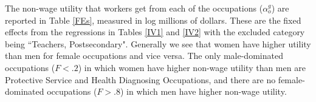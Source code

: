 \documentclass[12pt]{article}
\begin{document}
The non-wage utility that workers get from each of the occupations ($\alpha^g_o$) are reported in Table \ref{FEs}, measured in log millions of dollars. These are the fixed effects from the regressions in Tables \ref{IV1} and \ref{IV2} with the excluded category being ``Teachers, Postsecondary". Generally we see that women have higher utility than men for female occupations and vice versa. The only male-dominated occupations ($F<.2$) in which women have higher non-wage utility than men are Protective Service and Health Diagnosing Occupations, and there are no female-dominated occupations ($F>.8$) in which men have higher non-wage utility.










%
%
%
%
%
%
\end{document}
